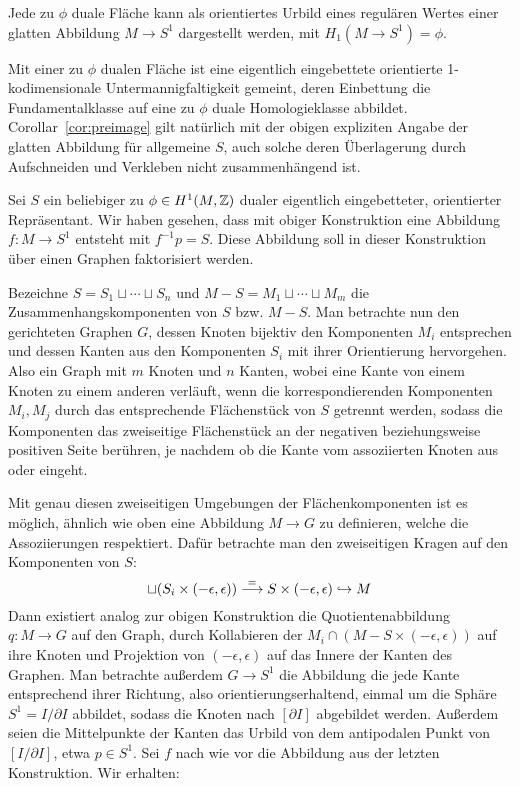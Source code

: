 \begin{cor}
\label{cor:preimage}
	Jede zu $\phi$ duale Fläche kann als orientiertes Urbild eines regulären Wertes einer glatten Abbildung $M\to S^1$ dargestellt werden, mit $H_1(M \to S^1)=\phi$.
\end{cor}
Mit einer zu $\phi$ dualen Fläche ist eine eigentlich eingebettete orientierte 1-kodimensionale Untermannigfaltigkeit gemeint, deren Einbettung die Fundamentalklasse auf eine zu $\phi$ duale Homologieklasse abbildet. Corollar~\ref{cor:preimage} gilt natürlich mit der obigen expliziten Angabe der glatten Abbildung für allgemeine $S$, auch solche deren Überlagerung durch Aufschneiden und Verkleben nicht zusammenhängend ist.

\begin{constr}
	\label{constr:graph}
	Sei $S$ ein beliebiger zu $\phi \in H^1(M,\mathbb{Z})$ dualer eigentlich eingebetteter, orientierter Repräsentant. Wir haben gesehen, dass mit obiger Konstruktion eine Abbildung $f:M\to S^1$ entsteht mit $f^{-1}p=S$. Diese Abbildung soll in dieser Konstruktion über einen Graphen faktorisiert werden.

	Bezeichne $S=S_1\sqcup \cdots \sqcup S_n$ und $M-S = M_1 \sqcup \cdots \sqcup M_m$ die Zusammenhangskomponenten von $S$ bzw. $M-S$. Man betrachte nun den gerichteten Graphen $G$, dessen Knoten bijektiv den Komponenten $M_i$ entsprechen und dessen Kanten aus den Komponenten $S_i$ mit ihrer Orientierung hervorgehen. Also ein Graph mit $m$ Knoten und $n$ Kanten, wobei eine Kante von einem Knoten zu einem anderen verläuft, wenn die korrespondierenden Komponenten $M_i, M_j$ durch das entsprechende Flächenstück von $S$ getrennt werden, sodass die Komponenten das zweiseitige Flächenstück an der negativen beziehungsweise positiven Seite berühren, je nachdem ob die Kante vom assoziierten Knoten aus oder eingeht.

	Mit genau diesen zweiseitigen Umgebungen der Flächenkomponenten ist es möglich, ähnlich wie oben eine Abbildung $M \to G$ zu definieren, welche die Assoziierungen respektiert. Dafür betrachte man den zweiseitigen Kragen auf den Komponenten von $S$:
	\[
		\sqcup (S_i \times (-\epsilon,\epsilon)) \stackrel = \longrightarrow S \times (-\epsilon,\epsilon) \hookrightarrow M
	\]
	Dann existiert analog zur obigen Konstruktion die Quotientenabbildung $q:M\to G$ auf den Graph, durch Kollabieren der $M_i\cap (M -S \times(-\epsilon,\epsilon))$ auf ihre Knoten und Projektion von $(-\epsilon,\epsilon)$ auf das Innere der Kanten des Graphen. Man betrachte außerdem $G \to S^1$ die Abbildung die jede Kante entsprechend ihrer Richtung, also orientierungserhaltend, einmal um die Sphäre $S^1 = I/\partial I$ abbildet, sodass die Knoten nach $[\partial I]$ abgebildet werden. Außerdem seien die Mittelpunkte der Kanten das Urbild von dem antipodalen Punkt von $[I/\partial I]$, etwa $p\in S^1$. Sei $f$ nach wie vor die Abbildung aus der letzten Konstruktion. Wir erhalten:
	

\end{constr}
